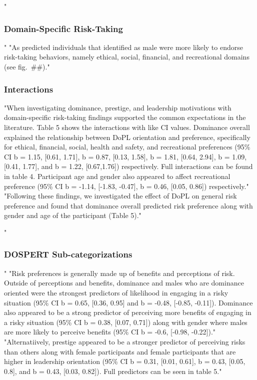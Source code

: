 \documentclass[
"  donotrepeattitle,doc, 12pt, a4paper,floatsintext]{apa7}"
\begin{document}
\hypertarget{domain-specific-risk-taking}{%
"\subsubsection{Domain-Specific Risk-Taking}\label{domain-specific-risk-taking}}"
"As predicted individuals that identified as male were more likely to endorse risk-taking behaviors, namely ethical, social, financial, and recreational domains (see fig.~\#\#)."
\hypertarget{interactions}{%
\subsubsection{Interactions}\label{interactions}}
"When investigating dominance, prestige, and leadership motivations with domain-specific risk-taking findings supported the common expectations in the literature. Table 5 shows the interactions with like CI values. Dominance overall explained the relationship between DoPL orientation and preference, specifically for ethical, financial, social, health and safety, and recreational preferences (95\% CI b = 1.15, {[}0.61, 1.71{]}, b = 0.87, {[}0.13, 1.58{]}, b = 1.81, {[}0.64, 2.94{]}, b = 1.09, {[}0.41, 1.77{]}, and b = 1.22, {[}0.67,1.76{]}) respectively. Full interactions can be found in table 4. Participant age and gender also appeared to affect recreational preference (95\% CI b = -1.14, {[}-1.83, -0.47{]}, b = 0.46, {[}0.05, 0.86{]}) respectively."
"Following these findings, we investigated the effect of DoPL on general risk preference and found that dominance overall predicted risk preference along with gender and age of the participant (Table 5)."
\hypertarget{dospert-sub-categorizations}{%
"\subsubsection{DOSPERT Sub-categorizations}\label{dospert-sub-categorizations}}"
"Risk preferences is generally made up of benefits and perceptions of risk. Outside of perceptions and benefits, dominance and males who are dominance oriented were the strongest predictors of likelihood in engaging in a risky situation (95\% CI b = 0.65, {[}0.36, 0.95{]} and b = -0.48, {[}-0.85, -0.11{]}). Dominance also appeared to be a strong predictor of perceiving more benefits of engaging in a risky situation (95\% CI b = 0.38, {[}0.07, 0.71{]}) along with gender where males are more likely to perceive benefits (95\% CI b = -0.6, {[}-0.98, -0.22{]})."
"Alternatiively, prestige appeared to be a stronger predictor of perceiving risks than others along with female participants and female participants that are higher in leadership orientation (95\% CI b = 0.31, {[}0.01, 0.61{]}, b = 0.43, {[}0.05, 0.8{]}, and b = 0.43, {[}0.03, 0.82{]}). Full predictors can be seen in table 5."
\end{document}
